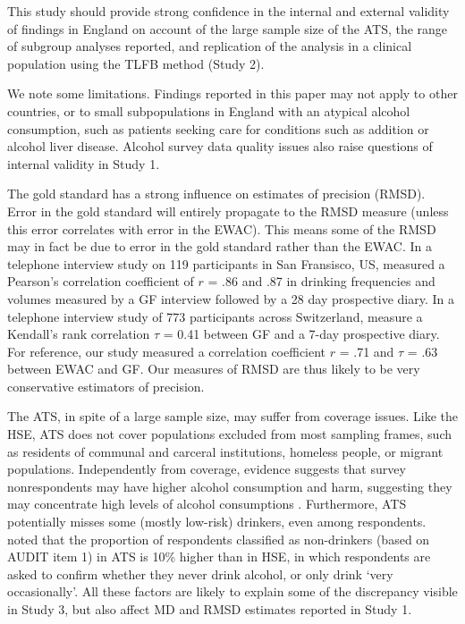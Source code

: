 \documentclass[]{article}
\begin{document}
This study should provide strong confidence in the internal and external
validity of findings in England on account of the large sample size of
the ATS, the range of subgroup analyses reported, and replication of the
analysis in a clinical population using the TLFB method (Study 2).

We note some limitations. Findings reported in this paper may not apply
to other countries, or to small subpopulations in England with an
atypical alcohol consumption, such as patients seeking care for
conditions such as addition or alcohol liver disease. Alcohol survey
data quality issues also raise questions of internal validity in Study
1.

The gold standard has a strong influence on estimates of precision
(RMSD). Error in the gold standard will entirely propagate to the RMSD
measure (unless this error correlates with error in the EWAC). This
means some of the RMSD may in fact be due to error in the gold standard
rather than the EWAC. In a telephone interview study on 119 participants
in San Fransisco, US, \citep{Greenfield2009} measured a Pearson's
correlation coefficient of \(r\) = .86 and .87 in drinking frequencies
and volumes measured by a GF interview followed by a 28 day prospective
diary. In a telephone interview study of 773 participants across
Switzerland, \citep{Heeb2005} measure a Kendall's rank correlation
\(\tau\) = 0.41 between GF and a 7-day prospective diary. For reference,
our study measured a correlation coefficient \(r\) = .71 and \(\tau\) =
.63 between EWAC and GF. Our measures of RMSD are thus likely to be very
conservative estimators of precision.

The ATS, in spite of a large sample size, may suffer from coverage
issues. Like the HSE, ATS does not cover populations excluded from most
sampling frames, such as residents of communal and carceral
institutions, homeless people, or migrant populations. Independently
from coverage, evidence suggests that survey nonrespondents may have
higher alcohol consumption and harm, suggesting they may concentrate
high levels of alcohol consumptions
\citep{Gorman2014, Christensen2015, Boniface2017}. Furthermore, ATS
potentially misses some (mostly low-risk) drinkers, even among
respondents. \citep{DeVocht2016} noted that the proportion of
respondents classified as non-drinkers (based on AUDIT item 1) in ATS is
10\% higher than in HSE, in which respondents are asked to confirm
whether they never drink alcohol, or only drink `very occasionally'. All
these factors are likely to explain some of the discrepancy visible in
Study 3, but also affect MD and RMSD estimates reported in Study 1.
\end{document}
